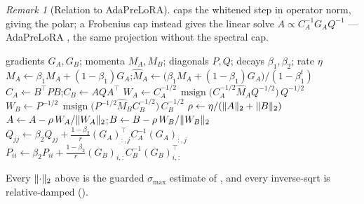 \documentclass[11pt]{article}
\newcommand{\smax}{\sigma_{\max}}
\DeclarePairedDelimiter{\norm}{\lVert}{\rVert}
\DeclareMathOperator{\polar}{msign}          %
\newcommand{\methodname}{PoLoRA\xspace}
\theoremstyle{plain}
\theoremstyle{definition}
\theoremstyle{remark}
\newtheorem{remark}{Remark}
\begin{document}
\begin{remark}[Relation to AdaPreLoRA]
 caps the whitened step in operator norm, giving the polar; a Frobenius cap instead gives the linear solve $\dot A\propto C_A^{-1}G_A Q^{-1}$ --- AdaPreLoRA \cite{adaprelora}, the same projection without the spectral cap.
\end{remark}

\begin{algorithm}[t]
\caption{\methodname{} step for one LoRA pair $(A,B)$ at iteration $t$}
\label{alg:ours}
\begin{algorithmic}[1]
\Require gradients $G_A,G_B$; momenta $M_A,M_B$; diagonals $P,Q$; decays $\beta_1,\beta_2$; rate $\eta$
\State $M_A\gets\beta_1 M_A+(1-\beta_1)G_A$;\quad $\hat M_A\gets\big(\beta_1 M_A+(1-\beta_1)G_A\big)/(1-\beta_1^{t})$ 
\State $C_A\gets B^\top P B$;\quad $C_B\gets A Q A^\top$ 
\State $W_A\gets C_A^{-1/2}\,\polar\!\big(C_A^{-1/2}\hat M_A Q^{-1/2}\big)\,Q^{-1/2}$
\State $W_B\gets P^{-1/2}\,\polar\!\big(P^{-1/2}\hat M_B C_B^{-1/2}\big)\,C_B^{-1/2}$
\State $\rho\gets\eta/(\norm{A}_2+\norm{B}_2)$
\State $A\gets A-\rho\,W_A/\norm{W_A}_2$;\quad $B\gets B-\rho\,W_B/\norm{W_B}_2$
\State $Q_{jj}\gets\beta_2 Q_{jj}+\tfrac{1-\beta_2}{r}(G_A)_{:,j}^\top C_A^{-1}(G_A)_{:,j}$
\State $P_{ii}\gets\beta_2 P_{ii}+\tfrac{1-\beta_2}{r}(G_B)_{i,:}C_B^{-1}(G_B)_{i,:}^\top$
\end{algorithmic}
\end{algorithm}
\noindent Every $\norm{\cdot}_2$ above is the guarded $\smax$ estimate of , and every inverse-sqrt is relative-damped ().
\end{document}
